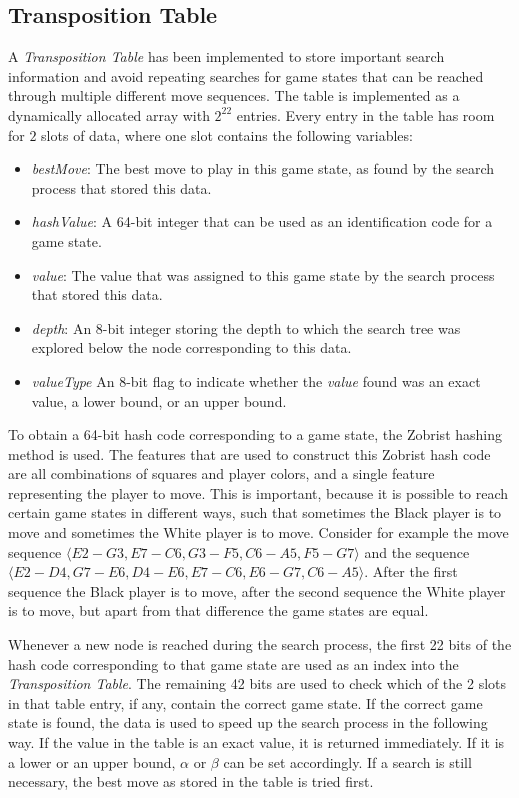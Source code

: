 \documentclass{article}
\begin{document}
\subsection{Transposition Table}
A \emph{Transposition Table} \cite{Greenblatt1967} has been implemented to store important search information and avoid repeating searches for game states that can be reached through multiple different move sequences. The table is implemented as a dynamically allocated array with $2^{22}$ entries. Every entry in the table has room for $2$ slots of data, where one slot contains the following variables:
\begin{itemize}
\item \emph{bestMove}: The best move to play in this game state, as found by the search process that stored this data.
\item \emph{hashValue}: A 64-bit integer that can be used as an identification code for a game state.
\item \emph{value}: The value that was assigned to this game state by the search process that stored this data.
\item \emph{depth}: An 8-bit integer storing the depth to which the search tree was explored below the node corresponding to this data.
\item \emph{valueType} An 8-bit flag to indicate whether the \emph{value} found was an exact value, a lower bound, or an upper bound.
\end{itemize}
To obtain a 64-bit hash code corresponding to a game state, the Zobrist hashing method \cite{Zobrist1970} is used. The features that are used to construct this Zobrist hash code are all combinations of squares and player colors, and a single feature representing the player to move. This is important, because it is possible to reach certain game states in different ways, such that sometimes the Black player is to move and sometimes the White player is to move. Consider for example the move sequence $\langle E2-G3, E7-C6, G3-F5, C6-A5, F5-G7\rangle$ and the sequence $\langle E2-D4, G7-E6, D4-E6, E7-C6, E6-G7, C6-A5\rangle$. After the first sequence the Black player is to move, after the second sequence the White player is to move, but apart from that difference the game states are equal.

Whenever a new node is reached during the search process, the first 22 bits of the hash code corresponding to that game state are used as an index into the \emph{Transposition Table}. The remaining 42 bits are used to check which of the 2 slots in that table entry, if any, contain the correct game state. If the correct game state is found, the data is used to speed up the search process in the following way. If the value in the table is an exact value, it is returned immediately. If it is a lower or an upper bound, $\alpha$ or $\beta$ can be set accordingly. If a search is still necessary, the best move as stored in the table is tried first.
\end{document}
